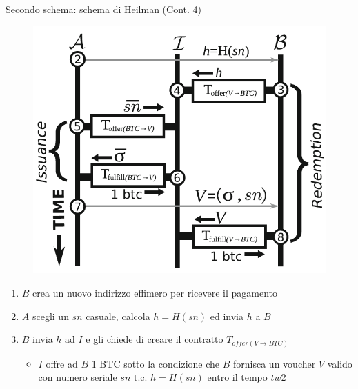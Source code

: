 \documentclass{beamer}
\begin{document}
  
  \begin{frame}{Secondo schema: schema di Heilman (Cont. 4)}
      \begin{figure}
          \centering
          \includegraphics[width=0.4\linewidth]{../img/heilman-scheme.png}
      \end{figure}
      
      \begin{enumerate}
          \item $B$ crea un nuovo indirizzo effimero per ricevere il pagamento \pause
          \item $A$ scegli un $sn$ casuale, calcola $h=H(sn)$ ed invia $h$ a $B$ \pause
          \item $B$ invia $h$ ad $I$ e gli chiede di creare il contratto $T_{offer(V\rightarrow BTC)}$
          \begin{itemize}
              \item[\MVRightarrow] $I$ offre ad $B$ 1 BTC sotto la condizione che $B$ fornisca un voucher $V$ valido con numero seriale $sn$ t.c. $h=H(sn)$ entro il tempo $tw2$
          \end{itemize}
      \end{enumerate}
  \end{frame}
  
  
  
\end{document}
